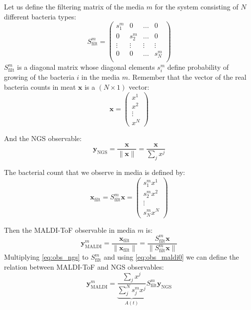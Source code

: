 \documentclass[10pt,A4paper]{article}
\begin{document}
Let us define the filtering matrix of the media $m$ for the system consisting of $N$ different bacteria types:
\begin{equation}
    S^m_\text{filt} = \begin{pmatrix}
        s^m_1  & 0       & ...    & 0      \\
        0      & s^m_2   & ...    & 0      \\
        \vdots & \vdots  & \vdots & \vdots \\
        0      & 0       & ...    & s^m_N  \\
    \end{pmatrix}
\end{equation}
$S^m_\text{filt}$ is a diagonal matrix whose diagonal elements $s^m_i$ define probability of growing of the  bacteria $i$ in the media $m$.
Remember that the vector of the real bacteria counts in meat $\mathbf{x}$ is a $( N \times 1)$ vector:
\begin{equation}
    \mathbf{x} = \begin{pmatrix} x^1 \\ x^2 \\ \vdots \\ x^N
    \end{pmatrix}
\end{equation}

And the NGS observable:
\begin{equation}
    \mathbf{y}_\text{NGS} = \frac{\mathbf{x}}{\lVert \mathbf{x} \rVert} = \frac{\mathbf{x}}{\sum_j x^j}
    \label{eq:obs_ngs}
\end{equation}

The bacterial count that we observe in media is defined by:
\begin{equation}
    \mathbf{x}_\text{filt} = S^m_\text{filt} \mathbf{x} = \begin{pmatrix} s^m_1 x^1 \\ s^m_2 x^2 \\ \vdots \\ s^m_N x^N \end{pmatrix}   
\end{equation}

Then the MALDI-ToF observable in media $m$ is:
\begin{equation}
    \mathbf{y}^m_\text{MALDI} = \frac{\mathbf{x}_\text{filt}}{\lVert \mathbf{x}_\text{filt} \rVert} = \frac{ S^m_\text{filt} \mathbf{x}}{\lVert S^m_\text{filt} \mathbf{x} \rVert}
    \label{eq:obs_maldi0}
\end{equation}
Multiplying \ref{eq:obs_ngs} to $S^m_\text{filt}$ and using \ref{eq:obs_maldi0} we can define the relation between MALDI-ToF and NGS observables:
\begin{equation}
    \mathbf{y}^m_\text{MALDI} = \underbrace{\frac{\sum_j x^j}{\sum_j^N s^m_j x^j}}_{A(t)} S^m_\text{filt} \mathbf{y}_\text{NGS}
\end{equation}
\end{document}
